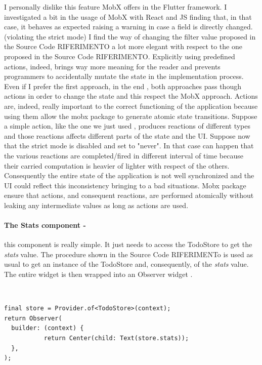 I personally dislike this feature MobX offers in the Flutter framework. I investigated a bit in the usage of MobX with React and JS finding that, in that case, it behaves as expected raising a warning in case a field is directly changed. (violating the strict mode) I find the way of changing the filter value proposed in the Source Code RIFERIMENTO a lot more elegant with respect to the one proposed in the Source Code RIFERIMENTO. Explicitly using predefined actions, indeed, brings way more meaning for the reader and prevents programmers to accidentally mutate the state in the implementation process. Even if I prefer the first approach, in the end , both approaches pass though actions in order to change the state and this respect the MobX approach. Actions are, indeed, really important to the correct functioning of the application because using them allow the mobx package to generate atomic state transitions. Suppose a simple action, like the one we just used , produces reactions of different types and those reactions affects different parts of the state and the UI. Suppose now that the strict mode is disabled and set to "never". In that case can happen that the various reactions are completed/fired in different interval of time because their carried computation is heavier of lighter with respect of the others. Consequently the entire state of the application is not well synchronized and the UI could reflect this inconsistency bringing to a bad situations. Mobx package ensure that actions, and consequent reactions, are performed atomically without leaking any intermediate values as long as actions are used.
\paragraph{The Stats component - }
\label{subpar:todo_app_bloc_core_state} this component is really simple. It just needs to access the TodoStore to get the \textit{stats} value. The procedure shown in the Source Code RIFERIMENTo is used as usual to get an instance of the TodoStore and, consequently, of the \textit{stats} value. The entire widget is then wrapped into an Observer widget .
\begin{code}
\mbox{}\\
 \mbox{}
		\label{code:2.14}
\begin{verbatim}
final store = Provider.of<TodoStore>(context);
return Observer(
  builder: (context) {
           return Center(child: Text(store.stats));
  },
);
\end{verbatim}
\mbox{}
\end{code}
